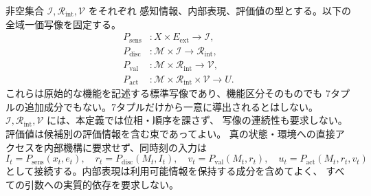 \begin{definition}
\label{def:three_primitives}
非空集合 $\mathcal I,\mathcal R_{\mathrm{int}},\mathcal V$ をそれぞれ
感知情報、内部表現、評価値の型とする。以下の全域一価写像を固定する。
\[
\begin{aligned}
P_{\mathrm{sens}}&:X\times E_{\mathrm{ext}}\to\mathcal I,\\
P_{\mathrm{disc}}&:\mathcal M\times\mathcal I\to\mathcal R_{\mathrm{int}},\\
P_{\mathrm{val}}&:\mathcal M\times\mathcal R_{\mathrm{int}}\to\mathcal V,\\
P_{\mathrm{act}}&:\mathcal M\times\mathcal R_{\mathrm{int}}\times\mathcal V\to U.
\end{aligned}
\]
これらは原始的な機能を記述する標準写像であり、機能区分そのものでも
7タプルの追加成分でもない。7タプルだけから一意に導出されるとはしない。
$\mathcal I,\mathcal R_{\mathrm{int}},\mathcal V$ には、本定義では位相・順序を課さず、
写像の連続性も要求しない。評価値は候補別の評価情報を含む束であってよい。
真の状態・環境への直接アクセスを内部機構に要求せず、同時刻の入力は
\[
 I_t=P_{\mathrm{sens}}(x_t,e_t),\quad
 r_t=P_{\mathrm{disc}}(M_t,I_t),\quad
 v_t=P_{\mathrm{val}}(M_t,r_t),\quad
 u_t=P_{\mathrm{act}}(M_t,r_t,v_t)
\]
として接続する。内部表現は利用可能情報を保持する成分を含めてよく、
すべての引数への実質的依存を要求しない。


\end{definition}
